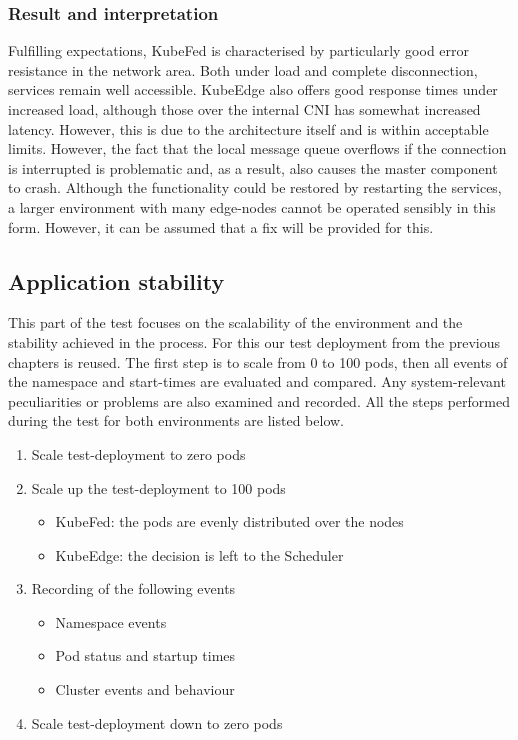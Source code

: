\documentclass[MSC,Master,english]{twbook}%
\begin{document}
\subsubsection{Result and interpretation} Fulfilling expectations, KubeFed is characterised by particularly good error resistance in the network area. Both under load and complete disconnection, services remain well accessible. KubeEdge also offers good response times under increased load, although those over the internal \ac{CNI} has somewhat increased latency. However, this is due to the architecture itself and is within acceptable limits. However, the fact that the local message queue overflows if the connection is interrupted is problematic and, as a result, also causes the master component to crash. Although the functionality could be restored by restarting the services, a larger environment with many edge-nodes cannot be operated sensibly in this form. However, it can be assumed that a fix will be provided for this.

\subsection{Application stability}
\label{sec:dsrtestapp}
This part of the test focuses on the scalability of the environment and the stability achieved in the process. For this our test deployment from the previous chapters is reused. The first step is to scale from 0 to 100 pods, then all events of the namespace and start-times are evaluated and compared. Any system-relevant peculiarities or problems are also examined and recorded. All the steps performed during the test for both environments are listed below.

\begin{enumerate}
    \itemsep0em
    \item Scale test-deployment to zero pods
    \item Scale up the test-deployment to 100 pods
    \begin{itemize}
        \item KubeFed: the pods are evenly distributed over the nodes
        \item KubeEdge: the decision is left to the Scheduler
    \end{itemize}
    \item Recording of the following events
    \begin{itemize}
        \itemsep0em
        \item Namespace events
        \item Pod status and startup times
        \item Cluster events and behaviour
    \end{itemize}
    \item Scale test-deployment down to zero pods
\end{enumerate}
\end{document}
